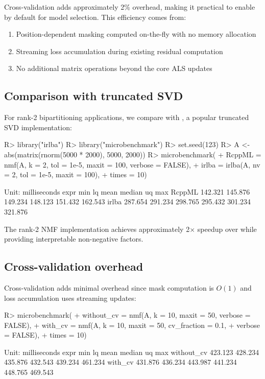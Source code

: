 \documentclass[article]{jss_modified}
\newcommand{\fct}[1]{\code{#1()}}
\begin{document}
Cross-validation adds approximately 2\% overhead, making it practical to enable 
by default for model selection. This efficiency comes from:

\begin{enumerate}
  \item Position-dependent masking computed on-the-fly with no memory allocation
  \item Streaming loss accumulation during existing residual computation
  \item No additional matrix operations beyond the core ALS updates
\end{enumerate}

\subsection{Comparison with truncated SVD}

For rank-2 bipartitioning applications, we compare with \fct{irlba} 
\citep{irlba}, a popular truncated SVD implementation:

\begin{CodeChunk}
\begin{CodeInput}
R> library("irlba")
R> library("microbenchmark")
R> set.seed(123)
R> A <- abs(matrix(rnorm(5000 * 2000), 5000, 2000))
R> microbenchmark(
+    RcppML = nmf(A, k = 2, tol = 1e-5, maxit = 100, verbose = FALSE),
+    irlba = irlba(A, nv = 2, tol = 1e-5, maxit = 100),
+    times = 10)
\end{CodeInput}
\begin{CodeOutput}
Unit: milliseconds
   expr      min       lq     mean   median       uq      max
 RcppML  142.321  145.876  149.234  148.123  151.432  162.543
  irlba  287.654  291.234  298.765  295.432  301.234  321.876
\end{CodeOutput}
\end{CodeChunk}

The rank-2 NMF implementation achieves approximately 2$\times$ speedup over 
\fct{irlba} while providing interpretable non-negative factors.

\subsection{Cross-validation overhead}

Cross-validation adds minimal overhead since mask computation is $O(1)$ and 
loss accumulation uses streaming updates:

\begin{CodeChunk}
\begin{CodeInput}
R> microbenchmark(
+    without_cv = nmf(A, k = 10, maxit = 50, verbose = FALSE),
+    with_cv = nmf(A, k = 10, maxit = 50, cv_fraction = 0.1, 
+                  verbose = FALSE),
+    times = 10)
\end{CodeInput}
\begin{CodeOutput}
Unit: milliseconds
       expr      min       lq     mean   median       uq      max
 without_cv  423.123  428.234  435.876  432.543  439.234  461.234
    with_cv  431.876  436.234  443.987  441.234  448.765  469.543
\end{CodeOutput}
\end{CodeChunk}
\end{document}
